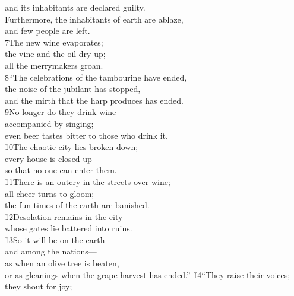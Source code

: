 \begin{poetry}
\poemll    and its inhabitants are declared guilty. \\
\poeml Furthermore, the inhabitants of earth are ablaze, \\
\poemll    and few people are left. \\
\poeml \v{7}The new wine evaporates; \\
\poemll    the vine and the oil dry up; \\
\poemlll       all the merrymakers groan. \\
\poeml \v{8}``The celebrations of the tambourine have ended, \\
\poemll    the noise of the jubilant has stopped, \\
\poemlll       and the mirth that the harp produces has ended. \\
\poeml \v{9}No longer do they drink wine \\
\poemll    accompanied by singing; \\
\poemlll       even beer tastes bitter to those who drink it. \\
\poeml \v{10}The chaotic city lies broken down; \\
\poemll    every house is closed up \\
\poemlll       so that no one can enter them. \\
\poeml \v{11}There is an outcry in the streets over wine; \\
\poemll    all cheer turns to gloom; \\
\poemlll       the fun times of the earth are banished. \\
\poeml \v{12}Desolation remains in the city \\
\poemll    whose gates lie battered into ruins. \\
\poeml \v{13}So it will be on the earth \\
\poemll    and among the nations--- \\
\poeml as when an olive tree is beaten, \\
\poemll    or as gleanings when the grape harvest has ended.''
\poeml \v{14}``They raise their voices; \\
\poemll    they shout for joy; \\

\end{poetry}

